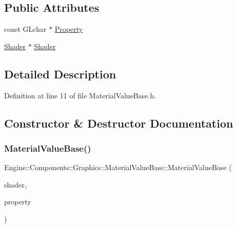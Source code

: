 \subsection*{Public Attributes}
\begin{DoxyCompactItemize}
\item 
const G\+Lchar $\ast$ \mbox{\hyperlink{classEngine_1_1Components_1_1Graphics_1_1MaterialValueBase_a53f5d1edea5f564931535250d3f5039c}{Property}}
\item 
\mbox{\hyperlink{classEngine_1_1Components_1_1Graphics_1_1Shader}{Shader}} $\ast$ \mbox{\hyperlink{classEngine_1_1Components_1_1Graphics_1_1MaterialValueBase_a45fd55d67557a2975f1274aa41045512}{Shader}}
\end{DoxyCompactItemize}


\subsection{Detailed Description}


Definition at line 11 of file Material\+Value\+Base.\+h.



\subsection{Constructor \& Destructor Documentation}
\mbox{\label{classEngine_1_1Components_1_1Graphics_1_1MaterialValueBase_aec4518ee9e8635ab6639609c92d0f89d}} 
\subsubsection{\texorpdfstring{Material\+Value\+Base()}{MaterialValueBase()}}
{\footnotesize\ttfamily Engine\+::\+Components\+::\+Graphics\+::\+Material\+Value\+Base\+::\+Material\+Value\+Base (\begin{DoxyParamCaption}\item[{\mbox{\hyperlink{classEngine_1_1Components_1_1Graphics_1_1Shader}{Shader}} $\ast$}]{shader,  }\item[{const G\+Lchar $\ast$}]{property }\end{DoxyParamCaption})\hspace{0.3cm}{\ttfamily [inline]}}



